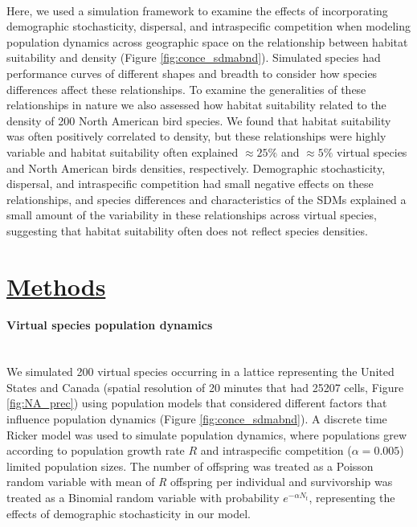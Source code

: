 \paragraph*{}
Here, we used a simulation framework to examine the effects of incorporating demographic stochasticity, dispersal, and intraspecific competition when modeling population dynamics across geographic space on the relationship between habitat suitability and density (Figure \ref{fig:conce_sdmabnd}). Simulated species had performance curves of different shapes and breadth to consider how species differences affect these relationships. To examine the generalities of these relationships in nature we also assessed how habitat suitability related to the density of 200 North American bird species. We found that habitat suitability was often positively correlated to density, but these relationships were highly variable and habitat suitability often explained $\approx 25\%$ and $\approx 5\%$ virtual species and North American birds densities, respectively. Demographic stochasticity, dispersal, and intraspecific competition had small negative effects on these relationships, and species differences and characteristics of the SDMs explained a small amount of the variability in these relationships across virtual species, suggesting that habitat suitability often does not reflect species densities.
 
\section*{\textbf{\underline{Methods}}}
\paragraph*{Virtual species population dynamics}\mbox{}\\
We simulated 200 virtual species occurring in a lattice representing the United States and Canada (spatial resolution of 20 minutes that had 25207 cells, Figure \ref{fig:NA_prec}) using population models that considered different factors that influence population dynamics (Figure \ref{fig:conce_sdmabnd}). A discrete time Ricker model was used to simulate population dynamics, where populations grew according to population growth rate $R$ and intraspecific competition ($\alpha = 0.005$) limited population sizes. The number of offspring was treated as a Poisson random variable with mean of \textit{R} offspring per individual and survivorship was treated as a Binomial random variable with probability $e^{- \alpha N_{t}}$, representing the effects of demographic stochasticity in our model. 

